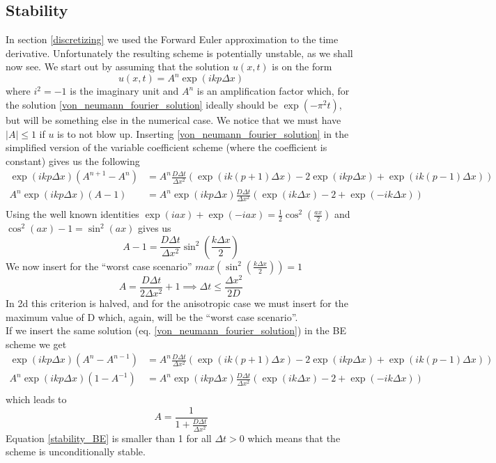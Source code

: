 \subsection{Stability}\label{stability}

In section \ref{discretizing} we used the Forward Euler approximation to the time derivative. 
Unfortunately the resulting scheme is potentially unstable, as we shall now see. 
We start out by assuming that the solution $u(x,t)$ is on the form 
\begin{equation}\label{von_neumann_fourier_solution}
 u(x,t) = A^n\exp(ikp\Delta x)
\end{equation}
where $i^2=-1$ is the imaginary unit and $A^n$ is an amplification factor which, for the solution \ref{von_neumann_fourier_solution} ideally should be $\exp(-\pi^2t)$, but will be something else in the numerical case. 
We notice that we must have $\left|A\right|\leq 1$ if $u$ is to not blow up. 
Inserting \ref{von_neumann_fourier_solution} in the simplified version of the variable coefficient scheme (where the coefficient is constant) gives us the following
\begin{align*}
 \exp(ikp\Delta x)\left(A^{n+1}-A^n\right) &= A^n\frac{D\Delta t}{\Delta x^2}\left(\exp(ik(p+1)\Delta x)-2\exp(ikp\Delta x) +\exp(ik(p-1)\Delta x)\right)\\
  A^n\exp(ikp\Delta x)\left(A-1\right) &=  A^n\exp(ikp\Delta x)\frac{D\Delta t}{\Delta x^2}\left(\exp(ik\Delta x) -2 + \exp(-ik\Delta x)\right)\\
\end{align*}
Using the well known identities $\exp(iax)+\exp(-iax) = \frac{1}{2}\cos^2\left(\frac{ax}{2}\right)$  and $\cos^2(ax)-1 = \sin^2(ax)$ gives us
\begin{equation}
 A-1 = \frac{D\Delta t}{\Delta x^2}\sin^2\left(\frac{k\Delta x}{2}\right)
\end{equation}
We now insert for the ``worst case scenario'' $max(\sin^2\left(\frac{k\Delta x}{2}\right))= 1$
\begin{equation}
 A = \frac{D\Delta t}{2\Delta x^2}+1 \implies \Delta t\leq\frac{\Delta x^2}{2D}
\end{equation}
In 2d this criterion is halved, and for the anisotropic case we must insert for the maximum value of D which, again, will be the ``worst case scenario''.\\
If we insert the same solution (eq. \ref{von_neumann_fourier_solution}) in the BE scheme we get
\begin{align*}
 \exp(ikp\Delta x)\left(A^{n}-A^{n-1}\right) &= A^n\frac{D\Delta t}{\Delta x^2}\left(\exp(ik(p+1)\Delta x)-2\exp(ikp\Delta x) +\exp(ik(p-1)\Delta x)\right)\\
  A^n\exp(ikp\Delta x)\left(1-A^{-1}\right) &=  A^n\exp(ikp\Delta x)\frac{D\Delta t}{\Delta x^2}\left(\exp(ik\Delta x) -2 + \exp(-ik\Delta x)\right)\\
\end{align*}
which leads to 
\begin{equation}\label{stability_BE}
A = \frac{1}{ 1+\frac{D\Delta t}{\Delta x^2}}
\end{equation}
Equation \ref{stability_BE} is smaller than 1 for all $\Delta t>0$ which means that the scheme is unconditionally stable.

